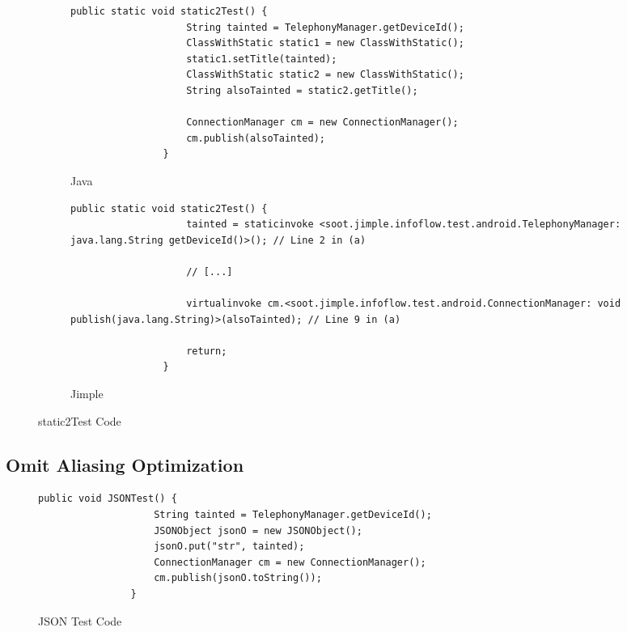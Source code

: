\documentclass[../draft.tex]{subfiles}
\begin{document}
    \begin{figure}[tbp]
        \centering
        \begin{subfigure}[b]{\textwidth}
            \begin{lstlisting}[gobble=16]
                public static void static2Test() {
                    String tainted = TelephonyManager.getDeviceId();
                    ClassWithStatic static1 = new ClassWithStatic();
                    static1.setTitle(tainted);
                    ClassWithStatic static2 = new ClassWithStatic();
                    String alsoTainted = static2.getTitle();

                    ConnectionManager cm = new ConnectionManager();
                    cm.publish(alsoTainted);
                }
            \end{lstlisting}
            \caption{Java}
        \end{subfigure}
        \qquad
        \begin{subfigure}[b]{\textwidth}
            \begin{lstlisting}[language=Jimple, gobble=16]
                public static void static2Test() {
                    tainted = staticinvoke <soot.jimple.infoflow.test.android.TelephonyManager: java.lang.String getDeviceId()>(); // Line 2 in (a)

                    // [...]

                    virtualinvoke cm.<soot.jimple.infoflow.test.android.ConnectionManager: void publish(java.lang.String)>(alsoTainted); // Line 9 in (a)

                    return;
                }
            \end{lstlisting}
            \caption{Jimple}
        \end{subfigure}
        \caption{static2Test Code}
        \label{lst:static2TestJava}
    \end{figure}

    \subsection{Omit Aliasing Optimization}
    \begin{figure}[tbp]
        \centering
        \begin{adjustbox}{max width=\columnwidth}   
            \begin{lstlisting}[gobble=16]
                public void JSONTest() {
                    String tainted = TelephonyManager.getDeviceId();
                    JSONObject jsonO = new JSONObject();
                    jsonO.put("str", tainted);
                    ConnectionManager cm = new ConnectionManager();
                    cm.publish(jsonO.toString());
                }
            \end{lstlisting}
        \end{adjustbox}
        \caption{JSON Test Code}
        \label{lst:json}
    \end{figure}
\end{document}
